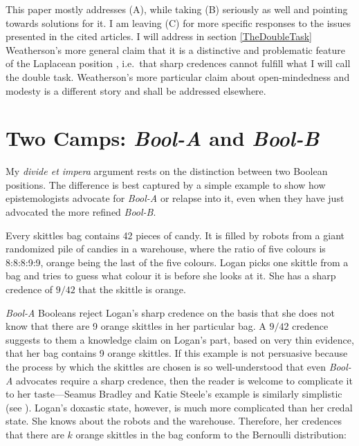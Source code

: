 \documentclass[11pt]{article}
\newcommand{\anderson}[0]{\textit{Bool-A}}
\newcommand{\augustin}[0]{\textit{Bool-B}}
\begin{document}
This paper mostly addresses (A), while taking (B) seriously as well
and pointing towards solutions for it. I am leaving (C) for more
specific responses to the issues presented in the cited articles. I
will address in section \ref{TheDoubleTask} Weatherson's more general
claim that it is a distinctive and problematic feature of the
Laplacean position 
, i.e.\ that sharp credences cannot fulfill
what I will call the double task. Weatherson's more particular claim
about open-mindedness and modesty is a different story and shall be
addressed elsewhere.

\section{Two Camps: {\anderson} and {\augustin}}
\label{PlebeiansAndAristocrats}

My \emph{divide et impera} argument rests on the distinction between
two Boolean positions. The difference is best captured by a simple
example to show how epistemologists advocate for {\anderson} or
relapse into it, even when they have just advocated the more refined
{\augustin}.

\begin{quotex}
  \label{ex:skittles} Every skittles bag contains
  42 pieces of candy. It is filled by robots from a giant randomized
  pile of candies in a warehouse, where the ratio of five colours is
  8:8:8:9:9, orange being the last of the five colours. Logan picks
  one skittle from a bag and tries to guess what colour it is before
  she looks at it. She has a sharp credence of $9/42$ that the skittle
  is orange.
\end{quotex}

{\anderson} Booleans reject Logan's sharp credence on the basis that
she does not know that there are 9 orange skittles in her particular
bag. A $9/42$ credence suggests to them a knowledge claim on Logan's
part, based on very thin evidence, that her bag contains 9 orange
skittles. If this example is not persuasive because the process by
which the skittles are chosen is so well-understood that even
{\anderson} advocates require a sharp credence, then the reader is
welcome to complicate it to her taste---Seamus Bradley and Katie
Steele's example is similarly simplistic (see
). Logan's doxastic state, however, is
much more complicated than her credal state. She knows about the
robots and the warehouse. Therefore, her credences that there are $k$
orange skittles in the bag conform to the Bernoulli distribution:
\end{document}
